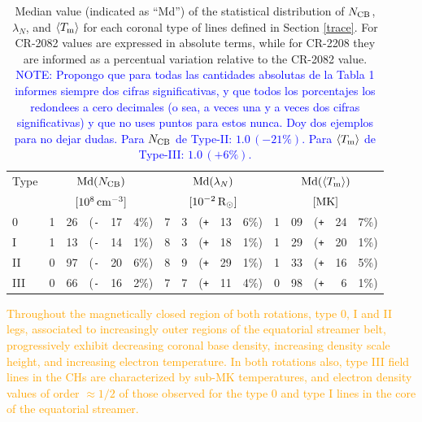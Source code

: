 \documentclass[namedreferences]{solarphysics}
\newcommand{\mrsun}{{\rm R_\odot}}
\newcommand{\med}{{\rm Md}}
\newcommand{\avgTe}{\left<\Tm\right>}
\newcommand{\MK}{{\rm MK}}
\newcommand{\lN}{\lambda_N}
\newcommand{\NCB}{N_{\rm CB}}
\newcommand{\Tm}{T_{\rm m}}
\newcommand{\aTm}{\left<\Tm\right>}
\newcommand{\Pl}{\texttt{+}}
\newcommand{\Mi}{\texttt{-}}
\def\albert#1{\textcolor{orange}{#1}}
\def\notebyalbert#1{\textcolor{blue}{NOTE: #1}}
\begin{document}
\begin{article}
\begin{table}[h!]
\begin{tabular}{l r@{.}l@{\hskip 0.05in} r@{\hskip 0.01in} r@{.}l  r@{.}l@{\hskip 0.05in} r@{\hskip 0.01in} r@{.}l r@{.}l@{\hskip 0.05in} r@{\hskip 0.01in} r@{.}l }
\hline
Type    & \multicolumn{5}{c}{$\med(\NCB)$}             & \multicolumn{5}{c}{$\med(\lN)$} & \multicolumn{5}{c}{$\med(\avgTe)$} \\
       & \multicolumn{5}{c}{$[10^8\,{\rm cm}^{-3}]$}  & \multicolumn{5}{c}{$[{\rm 10}^{-2}\,\mrsun]$} & \multicolumn{5}{c}{$[\MK]$} \\
\hline
0    & 1&26 &(\Mi&17&4\%)  &   7&3 &(\Pl&13&6\%) &   1&09 &(\Pl&24&7\%) \\
I    & 1&13 &(\Mi&14&1\%)  &   8&3 &(\Pl&18&1\%) &   1&29 &(\Pl&20&1\%) \\
II   & 0&97 &(\Mi&20&6\%)  &   8&9 &(\Pl&29&1\%) &   1&33 &(\Pl&16&5\%) \\
III  & 0&66 &(\Mi&16&2\%)  &   7&7 &(\Pl&11&4\%) &   0&98 &(\Pl&~6&1\%) \\
\hline          
\end{tabular}
\caption{Median value (indicated as ``Md'') of the statistical distribution of $\NCB$, $\lN$, and $\aTm$ for each coronal type of lines defined in Section \ref{trace}. For CR-2082 values are expressed in absolute terms, while for CR-2208 they are informed as a percentual variation relative to the CR-2082 value. \notebyalbert{Propongo que para todas las cantidades absolutas de la Tabla 1 informes siempre dos cifras significativas, y que todos los porcentajes los redondees a cero decimales (o sea, a veces una y a veces dos cifras significativas) y que no uses puntos para estos nunca. Doy dos ejemplos para no dejar dudas. Para $\NCB$ de Type-II: $1.0\,(-21\%)$. Para $\aTm$ de Type-III: $1.0\,(+6\%)$.}}
\label{tabla_demt}
\end{table}

\albert{Throughout the magnetically closed region of both rotations, type 0, I and II legs, associated to  increasingly outer regions of the equatorial streamer belt, progressively exhibit decreasing coronal base density, increasing density scale height, and increasing electron temperature. In both rotations also, type III field lines in the CHs are characterized by sub-MK temperatures, and electron density values of order $\approx 1/2$ of those observed for the type 0 and type I lines in the core of the equatorial streamer.}


\end{article}
\end{document}
